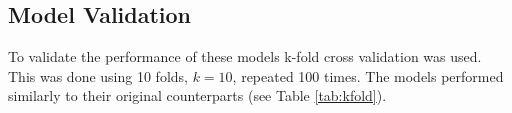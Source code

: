 \documentclass[review,12pt,authoryear]{elsarticle}
\begin{document}
\begin{linenumbers}
\subsection{Model Validation}
\begin{table}[]
  \label{tab:kfold}
  \caption{Model validation using k-fold cross validation, for 10 folds repeated 100 times.}
  \end{table}
To validate the performance of these models k-fold cross validation was used. This was done using 10 folds, $k=10$, repeated 100 times. The models performed similarly to their original counterparts (see Table \ref{tab:kfold}).


\end{linenumbers}
\end{document}
